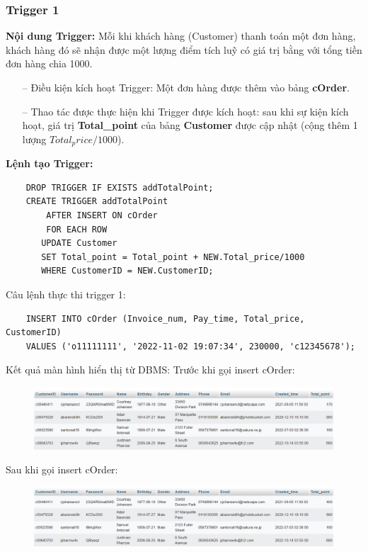      \subsubsection{Trigger 1}
\textbf{Nội dung Trigger:} Mỗi khi khách hàng (Customer) thanh toán một đơn hàng, khách hàng đó sẽ nhận được một lượng điểm tích luỹ có giá trị bằng với tổng tiền đơn hàng chia 1000.
\begin{itemize}
    \item[--] Điều kiện kích hoạt Trigger: Một đơn hàng được thêm vào bảng \textbf{cOrder}.
    \item[--] Thao tác được thực hiện khi Trigger được kích hoạt: sau khi sự kiện kích hoạt, giá trị \textbf{Total\_point} của bảng \textbf{Customer} được cập nhật (cộng thêm 1 lượng $Total_price/1000$).
\end{itemize}
\textbf{Lệnh tạo Trigger:}
\begin{verbatim}
    DROP TRIGGER IF EXISTS addTotalPoint;
    CREATE TRIGGER addTotalPoint
        AFTER INSERT ON cOrder
        FOR EACH ROW
	   UPDATE Customer
	   SET Total_point = Total_point + NEW.Total_price/1000
	   WHERE CustomerID = NEW.CustomerID;
\end{verbatim}
Câu lệnh thực thi trigger 1:
\begin{verbatim}
    INSERT INTO cOrder (Invoice_num, Pay_time, Total_price, CustomerID)
    VALUES ('o11111111', '2022-11-02 19:07:34', 230000, 'c12345678');
\end{verbatim}
Kết quả màn hình hiển thị từ DBMS:
Trước khi gọi insert cOrder:
\begin{figure}[h]
    \centering
    \includegraphics[scale=0.5]{images/addTotalPoint1.png}
\end{figure}

Sau khi gọi insert cOrder:
\begin{figure}[h]
    \centering
    \includegraphics[scale=0.5]{images/addTotalPoint2.png}
\end{figure}
